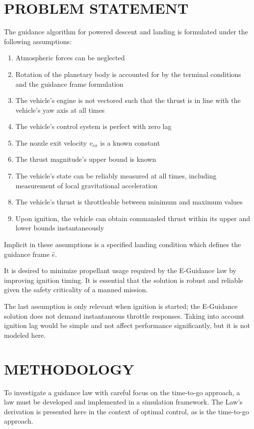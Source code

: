 \chapter{PROBLEM STATEMENT}
The guidance algorithm for powered descent and landing is formulated under the following assumptions:

\begin{enumerate}
\item Atmospheric forces can be neglected
\item Rotation of the planetary body is accounted for by the terminal conditions and the guidance frame formulation
\item The vehicle's engine is not vectored such that the thrust is in line with the vehicle's yaw axis at all times
\item The vehicle's control system is perfect with zero lag
\item The nozzle exit velocity $v_{ex}$ is a known constant
\item The thrust magnitude's upper bound is known
\item The vehicle's state can be reliably measured at all times, including measurement of local gravitational acceleration
\item The vehicle's thrust is throttleable between minimum and maximum values
\item Upon ignition, the vehicle can obtain commanded thrust within its upper and lower bounds instantaneously
\end{enumerate}

Implicit in these assumptions is a specified landing condition which defines the guidance frame $\hat{e}$. 

It is desired to minimize propellant usage required by the E-Guidance law by improving ignition timing. It is essential that the solution is robust and reliable given the safety criticality of a manned mission.

The last assumption is only relevant when ignition is started; the E-Guidance solution does not demand instantaneous throttle responses. Taking into account ignition lag would be simple and not affect performance significantly, but it is not modeled here.


\chapter{METHODOLOGY}
To investigate a guidance law with careful focus on the time-to-go approach, a law must be developed and implemented in a simulation framework. The Law's derivation is presented here in the context of optimal control, as is the time-to-go approach. 


